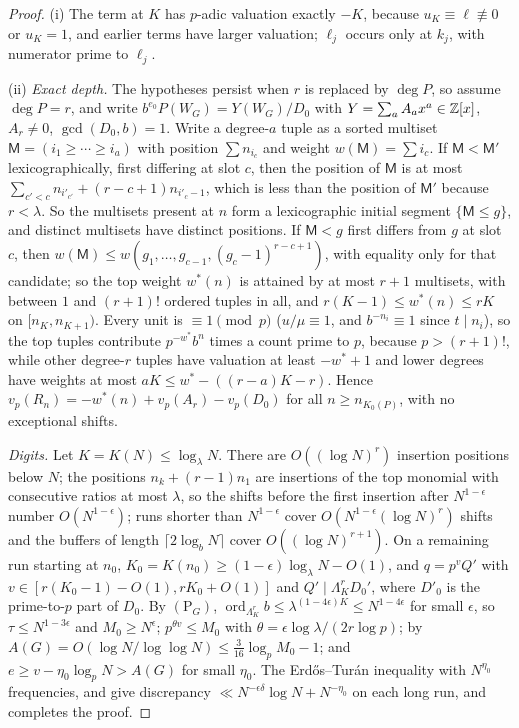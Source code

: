 \documentclass[11pt]{article}
\DeclareMathOperator{\ord}{ord}
\begin{document}
\begin{proof}
(i) The term at $K$ has $p$-adic valuation exactly $-K$, because $u_K\equiv\ell\not\equiv0$ or $u_K=1$, and earlier terms have larger
valuation; $\ell_j$ occurs only at $k_j$, with numerator prime to $\ell_j$.

(ii) \emph{Exact depth.} The hypotheses persist when $r$ is replaced by $\deg P$, so assume $\deg P=r$, and write
$b^{e_0}P(W_G)=Y(W_G)/D_0$ with $Y=\sum_aA_ax^a\in\mathbb Z[x]$, $A_r\ne0$, $\gcd(D_0,b)=1$. Write a degree-$a$ tuple as a sorted multiset
$\mathsf M=(i_1\ge\cdots\ge i_a)$ with position $\sum n_{i_c}$ and weight $w(\mathsf M)=\sum i_c$. If $\mathsf M<\mathsf M'$ lexicographically, first
differing at slot $c$, then the position of $\mathsf M$ is at most $\sum_{c'<c}n_{i'_{c'}}+(r-c+1)n_{i'_c-1}$, which is less than the
position of $\mathsf M'$ because $r<\lambda$. So the multisets present at $n$ form a lexicographic initial segment $\{\mathsf M\le g\}$, and
distinct multisets have distinct positions. If $\mathsf M<g$ first differs from $g$ at slot $c$, then
$w(\mathsf M)\le w(g_1,\ldots,g_{c-1},(g_c-1)^{r-c+1})$, with equality only for that candidate; so the top weight $w^*(n)$ is attained
by at most $r+1$ multisets, with between $1$ and $(r+1)!$ ordered tuples in all, and $r(K-1)\le w^*(n)\le rK$ on
$[n_K,n_{K+1})$. Every unit is $\equiv1\pmod p$ ($u/\mu\equiv1$, and $b^{-n_i}\equiv1$ since $t\mid n_i$), so the top tuples contribute
$p^{-w^*}b^n$ times a count prime to $p$, because $p>(r+1)!$, while other degree-$r$ tuples have valuation at least $-w^*+1$
and lower degrees have weights at most $aK\le w^*-((r-a)K-r)$. Hence $v_p(R_n)=-w^*(n)+v_p(A_r)-v_p(D_0)$ for all
$n\ge n_{K_0(P)}$, with no exceptional shifts.

\emph{Digits.} Let $K=K(N)\le\log_\lambda N$. There are $O((\log N)^r)$ insertion positions below $N$; the positions $n_k+(r-1)n_1$
are insertions of the top monomial with consecutive ratios at most $\lambda$, so the shifts before the first insertion after
$N^{1-\epsilon}$ number $O(N^{1-\epsilon})$; runs shorter than $N^{1-\epsilon}$ cover $O(N^{1-\epsilon}(\log N)^r)$ shifts and the buffers of length
$\lceil2\log_bN\rceil$ cover $O((\log N)^{r+1})$. On a remaining run starting at $n_0$, $K_0=K(n_0)\ge(1-\epsilon)\log_\lambda N-O(1)$, and
$q=p^vQ'$ with $v\in[r(K_0-1)-O(1),rK_0+O(1)]$ and $Q'\mid\Lambda_K^rD_0'$, where $D'_0$ is the prime-to-$p$ part of $D_0$. By
$(\mathrm P_G)$, $\ord_{\Lambda_K^r}b\le\lambda^{(1-4\epsilon)K}\le N^{1-4\epsilon}$ for small $\epsilon$, so $\tau\le N^{1-3\epsilon}$ and $M_0\ge N^\epsilon$;
$p^{\theta v}\le M_0$ with $\theta=\epsilon\log\lambda/(2r\log p)$; by  $A(G)=O(\log N/\log\log N)\le\frac3{16}\log_pM_0-1$;
and $e\ge v-\eta_0\log_pN>A(G)$ for small $\eta_0$. The Erd\H{o}s--Tur\'an inequality with $N^{\eta_0}$ frequencies, 
and  give discrepancy $\ll N^{-\epsilon\delta}\log N+N^{-\eta_0}$ on each long run, and 
completes the proof.


\end{proof}
\end{document}
